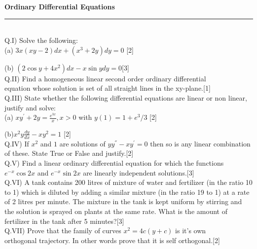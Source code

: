\documentclass[11pt]{article}
\begin{document}
\textbf{Ordinary Differential Equations}\\
\rule[0pt]{500pt}{0.25pt}\\


Q.I) Solve the following:\\
	
(a) $3x(xy-2)dx+(x^3+2y)dy=0$ \hspace{7cm}[2]

(b) $(2\cos{y}+4x^2)dx-x\sin{y}dy=0$\hspace{6.85cm}[3]\\ 

Q.II) Find a homogeneous linear second order ordinary differential \\  equation whose solution is set of all straight lines in the xy-plane.\hspace{2.5cm}[1]\\

Q.III) State whether the following differential equations are linear or non linear, justify and solve:\\

(a) $xy^{'}+2y=\frac{e^{3x}}{x} , x>0$ with $y(1)=1+e^3/3$ \hspace{5cm}[2]

(b)$x^2y\frac{dy}{dx}-xy^2=1$ \hspace{9.2cm}[2]\\

Q.IV) If $x^2$ and $1$ are solutions of $yy^{''}-xy^{'}=0$ then so is any linear combination of these. State True or False and justify.\hspace{5cm}[2]\\

Q.V) Find a linear ordinary differential equation for which the functions $e^{-x}\cos{2x}$ and $e^{-x}\sin{2x}$ are linearly independent solutions.\hspace{3.2cm}[3]\\

Q.VI) A tank contains 200 litres of mixture of water and fertilizer (in the ratio 10 to 1) which is diluted by adding a similar mixture (in the ratio 19 to 1) at a rate of 2 litres per minute. The mixture in the tank is kept uniform by stirring and the solution is sprayed on plants at the same rate. What is the amount of fertilizer in the tank after 5 minutes?\hspace{4.45cm}[3]\\

Q.VII) Prove that the family of curves $x^2=4c(y+c)$ is it's own \\orthogonal trajectory. In other words prove that it is self orthogonal.\hspace{1.8cm}[2]
\end{document}
